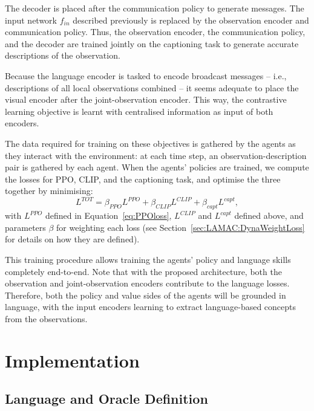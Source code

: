 The decoder is placed after the communication policy to generate messages. The input network $f_{in}$ described previously is replaced by the observation encoder and communication policy. Thus, the observation encoder, the communication policy, and the decoder are trained jointly on the captioning task to generate accurate descriptions of the observation. 

Because the language encoder is tasked to encode broadcast messages -- i.e., descriptions of all local observations combined -- it seems adequate to place the visual encoder after the joint-observation encoder. This way, the contrastive learning objective is learnt with centralised information as input of both encoders. 

The data required for training on these objectives is gathered by the agents as they interact with the environment: at each time step, an observation-description pair is gathered by each agent. When the agents' policies are trained, we compute the losses for PPO, CLIP, and the captioning task, and optimise the three together by minimising:
\begin{equation}
    L^{TOT}=\beta_{PPO}L^{PPO}+\beta_{CLIP}L^{CLIP}+\beta_{capt}L^{capt},
    \label{eq:LAMAC:Loss}
\end{equation}
with $L^{PPO}$ defined in Equation~\ref{eq:PPOloss}, $L^{CLIP}$ and $L^{capt}$ defined above, and parameters $\beta$ for weighting each loss (see Section~\ref{sec:LAMAC:DynaWeightLoss} for details on how they are defined).  

This training procedure allows training the agents' policy and language skills completely end-to-end. Note that with the proposed architecture, both the observation and joint-observation encoders contribute to the language losses. Therefore, both the policy and value sides of the agents will be grounded in language, with the input encoders learning to extract language-based concepts from the observations. 







\section{Implementation}

\subsection{Language and Oracle Definition}\label{sec:LAMAC:LanguageDef}

